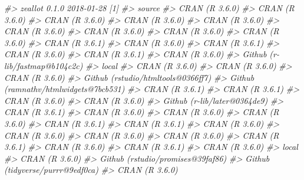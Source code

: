 \documentclass[
  12pt,
]{krantz}
\newenvironment{Shaded}{\begin{snugshade}}{\end{snugshade}}
\newcommand{\CommentTok}[1]{\textcolor[rgb]{0.56,0.35,0.01}{\textit{#1}}}
\begin{document}
\begin{Shaded}
\begin{Highlighting}[]
\CommentTok{#>  zeallot        0.1.0      2018-01-28 [1]}
\CommentTok{#>  source                               }
\CommentTok{#>  CRAN (R 3.6.0)                       }
\CommentTok{#>  CRAN (R 3.6.0)                       }
\CommentTok{#>  CRAN (R 3.6.0)                       }
\CommentTok{#>  CRAN (R 3.6.0)                       }
\CommentTok{#>  CRAN (R 3.6.0)                       }
\CommentTok{#>  CRAN (R 3.6.0)                       }
\CommentTok{#>  CRAN (R 3.6.0)                       }
\CommentTok{#>  CRAN (R 3.6.0)                       }
\CommentTok{#>  CRAN (R 3.6.0)                       }
\CommentTok{#>  CRAN (R 3.6.1)                       }
\CommentTok{#>  CRAN (R 3.6.0)                       }
\CommentTok{#>  CRAN (R 3.6.1)                       }
\CommentTok{#>  CRAN (R 3.6.0)                       }
\CommentTok{#>  CRAN (R 3.6.1)                       }
\CommentTok{#>  CRAN (R 3.6.0)                       }
\CommentTok{#>  Github (r-lib/fastmap@b104c2c)       }
\CommentTok{#>  local                                }
\CommentTok{#>  CRAN (R 3.6.0)                       }
\CommentTok{#>  CRAN (R 3.6.0)                       }
\CommentTok{#>  CRAN (R 3.6.0)                       }
\CommentTok{#>  Github (rstudio/htmltools@0366ff7)   }
\CommentTok{#>  Github (ramnathv/htmlwidgets@7bcb531)}
\CommentTok{#>  CRAN (R 3.6.1)                       }
\CommentTok{#>  CRAN (R 3.6.1)                       }
\CommentTok{#>  CRAN (R 3.6.0)                       }
\CommentTok{#>  CRAN (R 3.6.0)                       }
\CommentTok{#>  Github (r-lib/later@0364de9)         }
\CommentTok{#>  CRAN (R 3.6.1)                       }
\CommentTok{#>  CRAN (R 3.6.0)                       }
\CommentTok{#>  CRAN (R 3.6.0)                       }
\CommentTok{#>  CRAN (R 3.6.0)                       }
\CommentTok{#>  CRAN (R 3.6.1)                       }
\CommentTok{#>  CRAN (R 3.6.1)                       }
\CommentTok{#>  CRAN (R 3.6.0)                       }
\CommentTok{#>  CRAN (R 3.6.0)                       }
\CommentTok{#>  CRAN (R 3.6.0)                       }
\CommentTok{#>  CRAN (R 3.6.0)                       }
\CommentTok{#>  CRAN (R 3.6.1)                       }
\CommentTok{#>  CRAN (R 3.6.0)                       }
\CommentTok{#>  CRAN (R 3.6.1)                       }
\CommentTok{#>  CRAN (R 3.6.0)                       }
\CommentTok{#>  local                                }
\CommentTok{#>  CRAN (R 3.6.0)                       }
\CommentTok{#>  Github (rstudio/promises@39faf86)    }
\CommentTok{#>  Github (tidyverse/purrr@9edf0ca)     }
\CommentTok{#>  CRAN (R 3.6.0)                       }

\end{Highlighting}
\end{Shaded}
\end{document}
